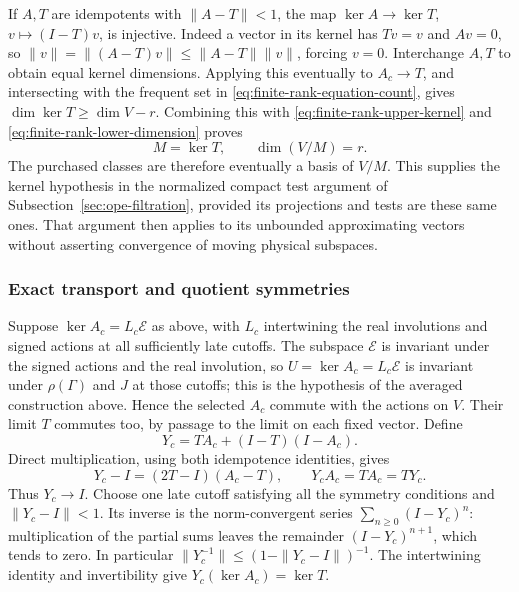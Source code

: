 If $A,T$ are idempotents with $\|A-T\|<1$, the map
$\ker A\to\ker T$, $v\mapsto(I-T)v$, is injective. Indeed a vector
in its kernel has $Tv=v$ and $Av=0$, so
$\|v\|=\|(A-T)v\|\le\|A-T\|\|v\|$, forcing $v=0$.
Interchange $A,T$ to obtain equal kernel dimensions. Applying this
eventually to $A_c\to T$, and intersecting with the frequent set in
\eqref{eq:finite-rank-equation-count}, gives
$\dim\ker T\ge\dim V-r$. Combining this with
\eqref{eq:finite-rank-upper-kernel} and
\eqref{eq:finite-rank-lower-dimension} proves
\begin{equation}\label{eq:finite-rank-exact-kernel}
                     M=\ker T,\qquad \dim(V/M)=r.
\end{equation}
The purchased classes are therefore eventually a basis of $V/M$.
This supplies the kernel hypothesis in the normalized compact test
argument of Subsection~\ref{sec:ope-filtration}, provided its projections
and tests are these same ones. That argument then applies to its
unbounded approximating vectors without asserting convergence of
moving physical subspaces.

\subsubsection{Exact transport and quotient symmetries}

Suppose $\ker A_c=L_c\mathcal E$ as above, with $L_c$ intertwining
the real involutions and signed actions at all sufficiently late
cutoffs. The subspace $\mathcal E$ is invariant under the signed
actions and the real involution, so $U=\ker A_c=L_c\mathcal E$ is
invariant under $\rho(\Gamma)$ and $J$ at those cutoffs; this is the
hypothesis of the averaged construction above. Hence the selected
$A_c$ commute with the actions on $V$. Their limit $T$ commutes too,
by passage to the limit on each fixed vector. Define
\begin{equation}\label{eq:finite-rank-conjugator}
                   Y_c=TA_c+(I-T)(I-A_c).
\end{equation}
Direct multiplication, using both idempotence identities, gives
\[
 Y_c-I=(2T-I)(A_c-T),\qquad Y_cA_c=TA_c=TY_c.
\]
Thus $Y_c\to I$. Choose one late cutoff satisfying all the symmetry
conditions and $\|Y_c-I\|<1$. Its inverse is the norm-convergent
series $\sum_{n\ge0}(I-Y_c)^n$: multiplication of the partial sums
leaves the remainder $(I-Y_c)^{n+1}$, which tends to zero. In particular
$\|Y_c^{-1}\|\le(1-\|Y_c-I\|)^{-1}$. The intertwining identity and
invertibility give $Y_c(\ker A_c)=\ker T$.

